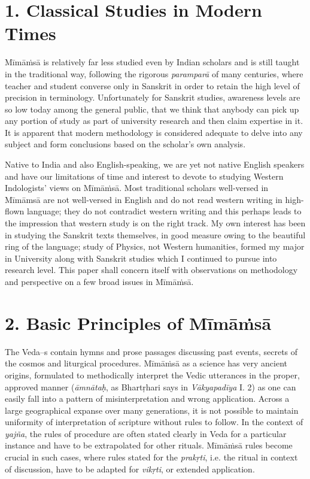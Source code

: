 \section*{1. Classical Studies in Modern Times}

Mīmāṁsā is relatively far less studied even by Indian scholars and is still taught in the traditional way, following the rigorous \textit{paramparā} of many centuries, where teacher and student converse only in Sanskrit in order to retain the high level of precision in terminology. Unfortunately for Sanskrit studies, awareness levels are so low today among the general public, that we think that anybody can pick up any portion of study as part of university research and then claim expertise in it. It is apparent that modern methodology is considered adequate to delve into any subject and form conclusions based on the scholar’s own analysis.

Native to India and also English-speaking, we are yet not native English speakers and have our limitations of time and interest to devote to studying Western Indologists’ views on Mīmāṁsā. Most traditional scholars well-versed in Mīmāmsā are not well-versed in English and do not read western writing in high-flown language; they do not contradict western writing and this perhaps leads to the impression that western study is on the right track. My own interest has been in studying the Sanskrit texts themselves, in good measure owing to the beautiful ring of the language; study of Physics, not Western humanities, formed my major in University along with Sanskrit studies which I continued to pursue into research level. This paper shall concern itself with observations on methodology and perspective on a few broad issues in Mīmāṁsā.

\vspace{-.3cm}

\section*{2. Basic Principles of Mīmāṁsā}

The Veda--s contain hymns and prose passages discussing past events, secrets of the cosmos and liturgical procedures. Mīmāṁsā as a science has very ancient origins, formulated to methodically interpret the Vedic utterances in the proper, approved manner (\textit{āmnātaḥ}, as Bhartṛhari says in \textit{Vākyapadīya} I. 2) as one can easily fall into a pattern of misinterpretation and wrong application. Across a large geographical expanse over many generations, it is not possible to maintain uniformity of interpretation of scripture without rules to follow. In the context of \textit{yajña}, the rules of procedure are often stated clearly in Veda for a particular instance and have to be extrapolated for other rituals. Mīmāṁsā rules become crucial in such cases, where rules stated for the \textit{prakṛti}, i.e. the ritual in context of discussion, have to be adapted for \textit{vikṛti}, or extended application.

